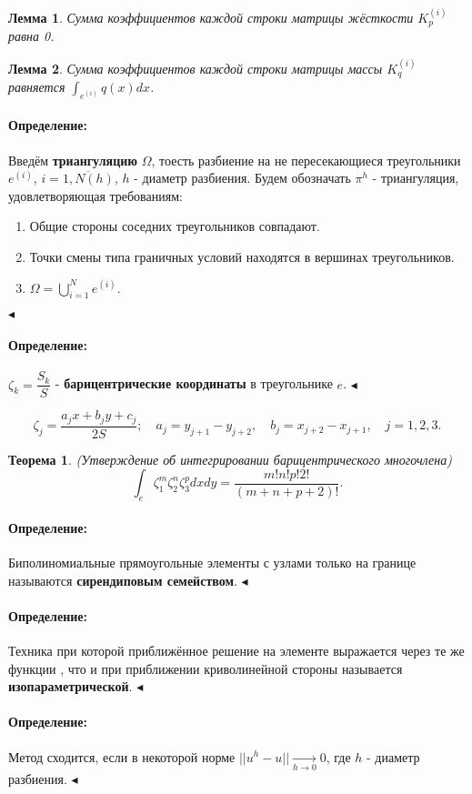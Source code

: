 \documentclass{article}
\newtheorem{theorem}{Теорема}
\newtheorem{lemma}{Лемма}
\newenvironment{definition}{ \paragraph{Определение:}}{\hfill $\blacktriangleleft$}
\begin{document}
\begin{lemma}
	Сумма коэффициентов каждой строки матрицы жёсткости $K_p^{(i)}$ равна 0.
\end{lemma}

\begin{lemma}
	Сумма коэффициентов каждой строки матрицы массы $K_q^{(i)}$ равняется $\int_{e^{(i)}}q(x) dx$.
\end{lemma}

\begin{definition}
	Введём \textbf{триангуляцию} $\Omega$, тоесть разбиение на не пересекающиеся треугольники $e^{(i)}$, $i=\overline{1,N(h)}$, $h$ - диаметр разбиения. Будем обозначать $\pi^h$ - триангуляция, удовлетворяющая требованиям:
	\begin{enumerate}
	\item Общие стороны соседних треугольников совпадают.
	\item Точки смены типа граничных условий находятся в вершинах треугольников.
	\item $\Omega = \bigcup_{i = 1}^{N} e^{(i)} $.
	\end{enumerate}
\end{definition}

\begin{definition}
	$\zeta_k = \dfrac{S_k}{S}$ - \textbf{барицентрические координаты} в треугольнике $e$.
\end{definition}

\[
	\zeta_j = \dfrac{a_j x + b_j y + c_j}{2S}; \quad a_j = y_{j+1} - y _{j+2}, \quad b_j = x_{j+2} - x_{j+1}, \quad j = 1,2,3.
\]

\begin{theorem}
	(Утверждение об интегрировании барицентрического многочлена)
	\[
	\int_e \zeta_1^m \zeta_2^n \zeta_3^p dx dy = \dfrac{m!n!p!2!}{(m+n+p+2)!}.	
	\]
\end{theorem}

\begin{definition}
	Биполиномиальные прямоугольные элементы с узлами только на границе называются \textbf{сирендиповым семейством}.
\end{definition}

\begin{definition}
	Техника при которой приближённое решение на элементе выражается через те же функции , что и при приближении криволинейной стороны называется \textbf{изопараметрической}.
\end{definition}

\begin{definition}
	Метод сходится, если в некоторой норме $||u^h - u|| \xrightarrow[h \to 0]{} 0$, где $h$ - диаметр разбиения.
\end{definition}
\end{document}

